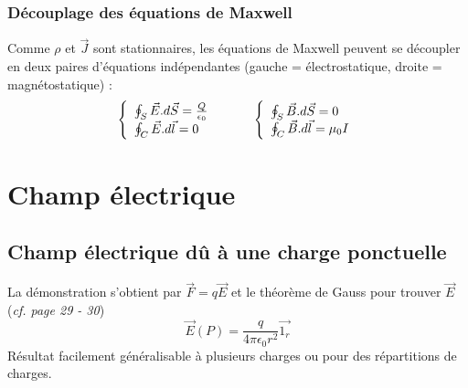 \documentclass	[11pt, a4paper, openany]{book}
\begin{document}
\subsubsection{Découplage des équations de Maxwell}
Comme $\rho$ et $\vec J$ sont stationnaires, les équations de Maxwell peuvent se découpler en deux paires d'équations indépendantes (gauche = électrostatique, droite = magnétostatique) : 
\begin{equation}
\left\{\begin{array}{l}
\oint_S \vec{E}.d\vec{S} = \frac{Q}{\epsilon_0}\\
\oint_C \vec{E}.d\vec{l} = 0
\end{array}\right. \ \ \\ \ \ \ \ \ \ \ \left\{\begin{array}{l}
\oint_S \vec{B}.d\vec{S} = 0\\
\oint_C \vec{B}.d\vec{l} = \mu_0 I
\end{array}\right.
\end{equation}

\section{Champ électrique}
\subsection{Champ électrique dû à une charge ponctuelle}
La démonstration s'obtient par $\vec{F} = q\vec{E}$ et le théorème de Gauss pour trouver $\vec{E}$ (\textit{cf. page 29 - 30})
\begin{equation}
\vec{E}(P) = \frac{q}{4\pi\epsilon_0r^2}\vec{1_r}
\end{equation}
Résultat facilement généralisable à plusieurs charges ou pour des répartitions de charges.
\end{document}
